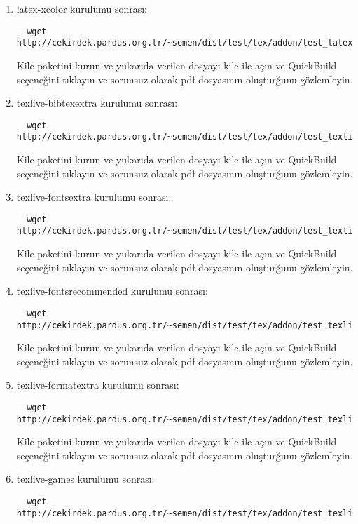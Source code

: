 \documentclass[a4paper,10pt]{article}
\begin{document}
\begin{enumerate}
\item  latex-xcolor kurulumu sonrası:
\begin{verbatim}
  wget http://cekirdek.pardus.org.tr/~semen/dist/test/tex/addon/test_latexxcolor.tex
\end{verbatim}

Kile paketini kurun ve yukarıda verilen dosyayı kile ile açın ve QuickBuild  seçeneğini tıklayın ve sorunsuz olarak pdf dosyasının oluşturğunu gözlemleyin.

\item texlive-bibtexextra kurulumu sonrası:
\begin{verbatim}
  wget http://cekirdek.pardus.org.tr/~semen/dist/test/tex/addon/test_texlivebibtexextra.tex
\end{verbatim}

Kile paketini kurun ve yukarıda verilen dosyayı kile ile açın ve QuickBuild  seçeneğini tıklayın ve sorunsuz olarak pdf dosyasının oluşturğunu gözlemleyin.
\item texlive-fontsextra kurulumu sonrası:
\begin{verbatim}
  wget http://cekirdek.pardus.org.tr/~semen/dist/test/tex/addon/test_texlivefontsextra.tex
\end{verbatim}

Kile paketini kurun ve yukarıda verilen dosyayı kile ile açın ve QuickBuild  seçeneğini tıklayın ve sorunsuz olarak pdf dosyasının oluşturğunu gözlemleyin.

\item texlive-fontsrecommended kurulumu sonrası:
\begin{verbatim}
  wget http://cekirdek.pardus.org.tr/~semen/dist/test/tex/addon/test_texlivefontsrecommended.tex
\end{verbatim}

Kile paketini kurun ve yukarıda verilen dosyayı kile ile açın ve QuickBuild  seçeneğini tıklayın ve sorunsuz olarak pdf dosyasının oluşturğunu gözlemleyin.

\item texlive-formatextra kurulumu sonrası:
\begin{verbatim}
  wget http://cekirdek.pardus.org.tr/~semen/dist/test/tex/addon/test_texliveformatsextra.tex
\end{verbatim}

Kile paketini kurun ve yukarıda verilen dosyayı kile ile açın ve QuickBuild  seçeneğini tıklayın ve sorunsuz olarak pdf dosyasının oluşturğunu gözlemleyin.

\item texlive-games kurulumu sonrası:
\begin{verbatim}
  wget http://cekirdek.pardus.org.tr/~semen/dist/test/tex/addon/test_texlivegames.tex
\end{verbatim}


\end{enumerate}
\end{document}
